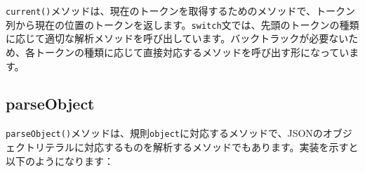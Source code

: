 \begin{Shaded}
\begin{Highlighting}[]
     \NormalTok{() \{}
\NormalTok{();}
        \NormalTok{) \{}
                 \NormalTok{();}
                 \NormalTok{();}
                 \NormalTok{();}
                 \NormalTok{();}
                 \NormalTok{();}
                 \NormalTok{();}
                 \NormalTok{();}
\NormalTok{        \}}
          \NormalTok{(}\NormalTok{);}
\NormalTok{    \}}
\end{Highlighting}
\end{Shaded}

\texttt{current()}メソッドは、現在のトークンを取得するためのメソッドで、トークン列から現在の位置のトークンを返します。\texttt{switch}文では、先頭のトークンの種類に応じて適切な解析メソッドを呼び出しています。バックトラックが必要ないため、各トークンの種類に応じて直接対応するメソッドを呼び出す形になっています。

\hypertarget{chapter3-parseobject}{%
\subsection{parseObject}\label{chapter3-parseobject}}

\texttt{parseObject()}メソッドは、規則\texttt{object}に対応するメソッドで、JSONのオブジェクトリテラルに対応するものを解析するメソッドでもあります。実装を示すと以下のようになります：

